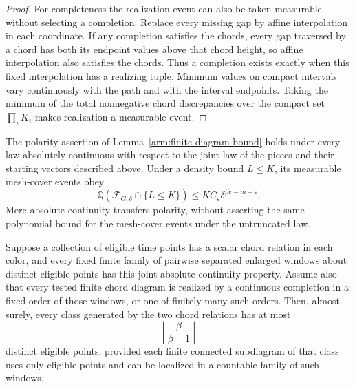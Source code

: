 \begin{proof}
For completeness the realization event can also be taken measurable
without selecting a completion.  Replace every missing gap by affine
interpolation in each coordinate.  If any completion satisfies the
chords, every gap traversed by a chord has both its endpoint values
above that chord height, so affine interpolation also satisfies the
chords.  Thus a completion exists exactly when this fixed interpolation
has a realizing tuple.  Minimum values on compact intervals vary
continuously with the path and with the interval endpoints.  Taking
the minimum of the total nonnegative chord discrepancies over the
compact set $\prod_i K_i$ makes realization a measurable event.
\end{proof}

\begin{corollary}
\label{arm:finite-diagram-transfer}
The polarity assertion of Lemma~\ref{arm:finite-diagram-bound} holds
under every law absolutely continuous with respect to the joint law
of the pieces and their starting vectors described above.
Under a density bound $L\le K$, its measurable mesh-cover events obey
\[
 \mathbb Q(\mathcal F_{G,\delta}\cap\{L\le K\})
 \le K C_\varepsilon\delta^{\beta e-m-\varepsilon}.
\]
Mere absolute continuity transfers polarity, without asserting the
same polynomial bound for the mesh-cover events under the untruncated
law.

Suppose a collection of eligible time points has a scalar chord
relation in each color, and every fixed finite family of pairwise
separated enlarged windows about distinct eligible points has this
joint absolute-continuity property.  Assume also that every tested
finite chord diagram is realized by a continuous completion in a
fixed order of those windows, or one of finitely many such orders.
Then, almost surely, every class generated by the two chord relations
has at most
\begin{equation}
\label{arm:finite-class-bound}
 \left\lfloor\frac{\beta}{\beta-1}\right\rfloor
\end{equation}
distinct eligible points, provided each finite connected subdiagram of
that class uses only eligible points and can be localized in a countable
family of such windows.
\end{corollary}

